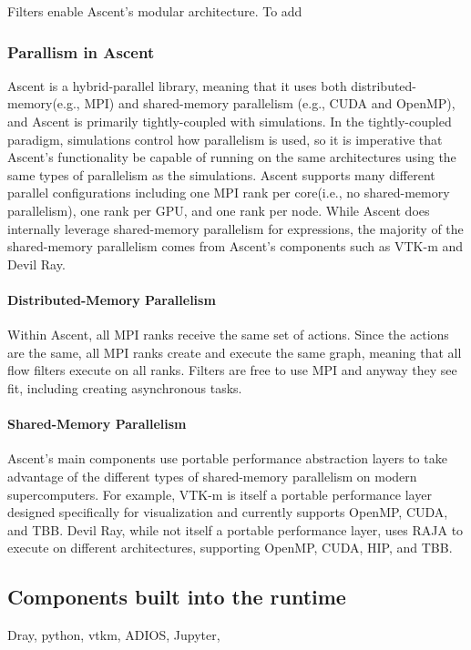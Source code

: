 Filters enable Ascent's modular architecture.
%
To add

\subsubsection{Parallism in Ascent}
Ascent is a hybrid-parallel library, meaning that it uses both
distributed-memory(e.g., MPI) and shared-memory parallelism
(e.g., CUDA and OpenMP), and Ascent is primarily  
tightly-coupled with simulations.
%
In the tightly-coupled paradigm, simulations control how parallelism is used, so
it is imperative that Ascent's functionality be capable of running
on the same architectures using the same types of parallelism as the
simulations.
%
Ascent supports many different parallel configurations including
one MPI rank per core(i.e., no shared-memory parallelism), one rank
per GPU, and one rank per node.
%
While Ascent does internally leverage shared-memory parallelism
for expressions, the majority of the shared-memory parallelism comes
from Ascent's components such as VTK-m and Devil Ray.

\paragraph{Distributed-Memory Parallelism}
Within Ascent, all MPI ranks receive the same set of actions.
%
Since the actions are the same, all MPI ranks create and execute the same graph,
meaning
that all flow filters execute on all ranks.
%
Filters are free to use MPI and anyway they see fit, including
creating asynchronous tasks.

\paragraph{Shared-Memory Parallelism}
Ascent's main components use portable performance abstraction layers to
take advantage of the different types of shared-memory parallelism on
modern supercomputers.
%
For example, VTK-m is itself a portable performance layer designed specifically
for visualization and currently supports OpenMP, CUDA, and TBB.
%
Devil Ray, while not itself a portable performance layer, uses RAJA to execute
on different architectures, supporting OpenMP, CUDA, HIP, and TBB.

\subsection{Components built into the runtime}
Dray, python, vtkm, ADIOS, Jupyter,

